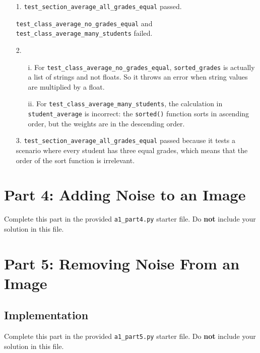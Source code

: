 \documentclass[fontsize=11pt]{article}
\begin{document}
    \begin{enumerate}
        \item[1.]
        \texttt{test\_section\_average\_all\_grades\_equal} passed.

        \texttt{test\_class\_average\_no\_grades\_equal} and \texttt{test\_class\_average\_many\_students} failed.

        \item[2.]
        \begin{enumerate}
            \item[i.] For \texttt{test\_class\_average\_no\_grades\_equal}, \texttt{sorted\_grades} is actually a list of strings and not floats. So it throws an error when string values are multiplied by a float.
            \item[ii.] For \texttt{test\_class\_average\_many\_students}, the calculation in \texttt{student\_average} is incorrect: the \texttt{sorted()} function sorts in ascending order, but the weights are in the descending order.
        \end{enumerate}

        \item[3.]
        \texttt{test\_section\_average\_all\_grades\_equal} passed because it tests a scenario where every student has three equal grades, which means that the order of the sort function is irrelevant.
    \end{enumerate}

    \section*{Part 4: Adding Noise to an Image}

    Complete this part in the provided \texttt{a1\_part4.py} starter file.
    Do \textbf{not} include your solution in this file.

    \newpage

    \section*{Part 5: Removing Noise From an Image}

    \subsection*{Implementation}

    Complete this part in the provided \texttt{a1\_part5.py} starter file.
    Do \textbf{not} include your solution in this file.
\end{document}
